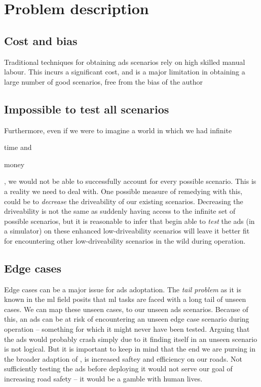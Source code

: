 \section{Problem description}\label{sec:problemDescription}

\subsection{Cost and bias}

Traditional techniques for obtaining \acrshort{ads} scenarios rely on high skilled manual labour.
This incurs a significant cost, and is a major limitation in obtaining a large number of good
scenarios, free from the bias of the author


\subsection{Impossible to test all scenarios}
Furthermore, even if we were to imagine a world in which we had infinite \begin{inparaenum}
    \item time and
    \item money
\end{inparaenum}, we would not be able to successfully account for every possible scenario. This is
a reality we need to deal with. One possible measure of remedying with this, could be to
\textit{decrease} the driveability of our existing scenarios. Decreasing the driveability is not the
same as suddenly having access to the infinite set of possible scenarios, but it is reasonable to
infer that begin able to \textit{test} the \acrshort{ads} (in a simulator) on these enhanced
low-driveability scenarios will leave it better fit for encountering other low-driveability
scenarios in the wild during operation.

\subsection{Edge cases}

Edge cases can be a major issue for \acrshort{ads} adoptation. The \textit{tail problem} as it is
known in the \acrshort{ml} field posits that \acrshort{ml} tasks are faced with a long tail of
unseen cases. We can map these unseen cases, to our unseen \acrshort{ads} scenarios. Because of
this, an \acrshort{ads} can be at risk of encountering an unseen edge case scenario during
operation -- something for which it might never have been tested.
Arguing that the \acrshort{ads} would probably crash simply due to it finding itself in an unseen
scenario is not logical. But it is important to keep in mind that the end we are pursing in the
broader adaption of , is increased saftey and efficiency on our roads. Not
sufficiently testing the \acrshort{ads} before deploying it would not serve our goal of increasing
road safety -- it would be a gamble with human lives.

